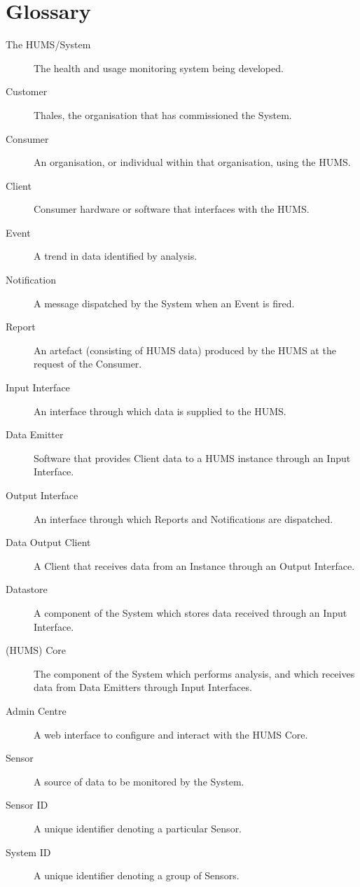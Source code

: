 \documentclass[10pt,a4paper]{article}
\begin{document}
\section{Glossary}
\label{sec:glossary}
\begin{description}%
	\item[The HUMS/System] The health and usage monitoring system being developed.
	
	\vspace{0.15cm}
	\item[Customer] Thales, the organisation that has commissioned the System.
	\item[Consumer] An organisation, or individual within that organisation, using the HUMS.
	\item[Client] Consumer hardware or software that interfaces with the HUMS.
	
	\vspace{0.15cm}
	\item[Event] A trend in data identified by analysis.
	\item[Notification] A message dispatched by the System when an Event is fired.
	\item[Report] An artefact (consisting of HUMS data) produced by the HUMS at the request of the Consumer.
	
	\vspace{0.15cm}
	\item[Input Interface] An interface through which data is supplied to the HUMS.
	\item[Data Emitter] Software that provides Client data to a HUMS instance through an Input Interface.
	\item[Output Interface] An  interface through which Reports and Notifications are dispatched.
	\item[Data Output Client] A Client that receives data from an Instance through an Output Interface.
    \item[Datastore] A component of the System which stores data received through an Input Interface.
    \item[(HUMS) Core] The component of the System which performs analysis, and which receives data from Data Emitters through Input Interfaces.
	\item[Admin Centre] A web interface to configure and interact with the HUMS Core.

	\vspace{0.15cm}
	\item[Sensor] A source of data to be monitored by the System.
	\item[Sensor ID] A unique identifier denoting a particular Sensor.
	\item[System ID] A unique identifier denoting a group of Sensors.
\end{description}
\end{document}
